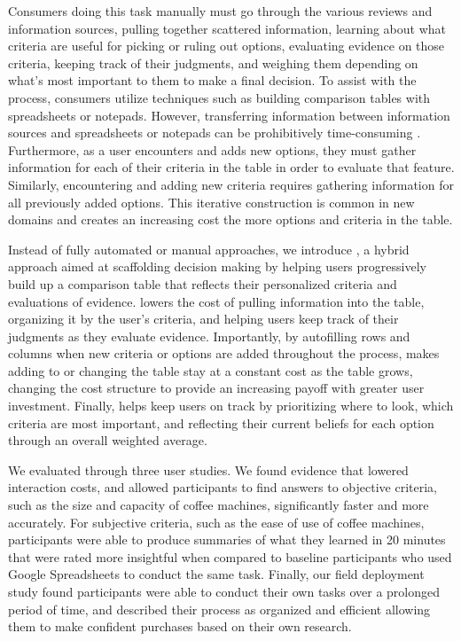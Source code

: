 Consumers doing this task manually must go through the various reviews and information sources, pulling together scattered information, learning about what criteria are useful for picking or ruling out options, evaluating evidence on those criteria, keeping track of their judgments, and weighing them depending on what's most important to them to make a final decision. To assist with the process, consumers utilize techniques such as building comparison tables with spreadsheets or notepads. However, transferring information between information sources and spreadsheets or notepads can be prohibitively time-consuming \cite{altmann2004task}. Furthermore, as a user encounters and adds new options, they must gather information for each of their criteria in the table in order to evaluate that feature. Similarly, encountering and adding new criteria requires gathering information for all previously added options. This iterative construction is common in new domains \cite{marchionini2006exploratory} and creates an increasing cost the more options and criteria in the table.

Instead of fully automated or manual approaches, we introduce \SYSTEM, a hybrid approach aimed at scaffolding decision making by helping users progressively build up a comparison table that reflects their personalized criteria and evaluations of evidence. \SYSTEM lowers the cost of pulling information into the table, organizing it by the user’s criteria, and helping users keep track of their judgments as they evaluate evidence. Importantly, by autofilling rows and columns when new criteria or options are added throughout the process, \SYSTEM makes adding to or changing the table stay at a constant cost as the table grows, changing the cost structure to provide an increasing payoff with greater user investment. Finally, \SYSTEM helps keep users on track by prioritizing where to look, which criteria are most important, and reflecting their current beliefs for each option through an overall weighted average.

We evaluated \SYSTEM through three user studies. We found evidence that \SYSTEM lowered interaction costs, and allowed participants to find answers to objective criteria, such as the size and capacity of coffee machines, significantly faster and more accurately. For subjective criteria, such as the ease of use of coffee machines, participants were able to produce summaries of what they learned in 20 minutes that were rated more insightful when compared to baseline participants who used Google Spreadsheets to conduct the same task. Finally, our field deployment study found participants were able to conduct their own tasks over a prolonged period of time, and described their process as organized and efficient allowing them to make confident purchases based on their own research.

